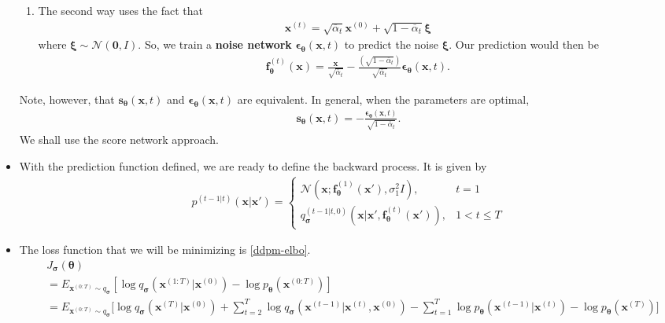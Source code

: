\documentclass[10pt]{article}
\newcommand{\ve}[1]{\mathbf{#1}}
\newcommand{\ves}[1]{\boldsymbol{#1}}
\newcommand{\mcal}[1]{\mathcal{#1}}
\begin{document}
\begin{itemize}
\begin{enumerate}
    \item The second way uses the fact that
    \begin{align*}
      \ve{x}^{(t)} = \sqrt{\overline{\alpha}_t} \ve{x}^{(0)} + \sqrt{1 - \overline{\alpha}_t} \ves{\xi}
    \end{align*}
    where $\ves{\xi} \sim \mcal{N}(\ve{0},I)$. So, we train a {\bf noise network} $\ves{\epsilon}_{\ves{\theta}}(\ve{x},t)$ to predict the noise $\ves{\xi}$. Our prediction would then be
    \begin{align*}
      \ve{f}^{(t)}_{\ves{\theta}}(\ve{x}) = \frac{\ve{x}}{\sqrt{\overline{\alpha}_t}} - \frac{(\sqrt{1 - \overline{\alpha}_t})}{{\sqrt{\overline{\alpha}_t}} } \ves{\epsilon}_{\ves{\theta}}(\ve{x}, t).
    \end{align*}
  \end{enumerate}
  Note, however, that $\ve{s}_{\ves{\theta}}(\ve{x}, t)$ and $\ve{\epsilon}_{\ves{\theta}}(\ve{x}, t)$ are equivalent. In general, when the parameters are optimal,
  \begin{align*}
    \ve{s}_{\ves{\theta}}(\ve{x}, t) = - \frac{\ves{\epsilon}_{\ves{\theta}}(\ve{x},t)}{\sqrt{1 - \overline{\alpha}_t}}.
  \end{align*}
  We shall use the score network approach.
  
  \item With the prediction function defined, we are ready to define the backward process. It is given by
  \begin{align*}
    p^{(t-1|t)}(\ve{x}|\ve{x}') =
    \begin{cases}
      \mcal{N}(\ve{x}; \ve{f}_{\ves{\theta}}^{(1)}(\ve{x}'), \sigma^2_1 I), & t = 1 \\
      q_{\ves{\sigma}}^{(t-1|t,0)}(\ve{x}|\ve{x}',\ve{f}^{(t)}_{\ves{\theta}}(\ve{x}')), & 1 < t \leq T
    \end{cases}
  \end{align*}

  \item The loss function that we will be minimizing is \eqref{ddpm-elbo}.
  \begin{align*}
    &J_{\ves{\sigma}}(\ves{\theta}) \\
    &= E_{\ve{x}^{(0:T)} \sim q_{\ves{\sigma}}} [ \log q_{\ves{\sigma}}(\ve{x}^{(1:T)}|\ve{x}^{(0)}) - \log p_{\ves{\theta}}(\ve{x}^{(0:T)}) ] \\
    &= E_{\ve{x}^{(0:T)} \sim q_{\ves{\sigma}}} \bigg[ 
      \log q_{\ves{\sigma}}(\ve{x}^{(T)}|\ve{x}^{(0)})
      + \sum_{t=2}^T \log q_{\ves{\sigma}}(\ve{x}^{(t-1)}|\ve{x}^{(t)},\ve{x}^{(0)}) 
      - \sum_{t=1}^T \log p_{\ves{\theta}}(\ve{x}^{(t-1)}|\ve{x}^{(t)}) 
      - \log p_{\ves{\theta}}(\ves{x}^{(T)})
    \bigg]
  \end{align*}


\end{itemize}
\end{document}
